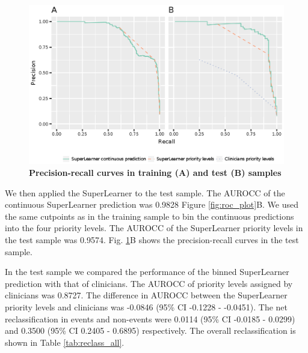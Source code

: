 \documentclass[10pt,letterpaper]{article}\usepackage[]{graphicx}\usepackage[]{color}
\begin{document}
\begin{figure}[!h]
  \caption{\bf Precision-recall curves in training (A) and test (B) samples}
  \label{fig:prec_rec_plot}
  \includegraphics{prec_rec_plot.eps}
\end{figure}

We then applied the SuperLearner to the test sample. The AUROCC of the
continuous SuperLearner prediction was 0.9828
Figure \ref{fig:roc_plot}B.  We used the same cutpoints as in the training
sample to bin the continuous predictions into the four priority levels. The
AUROCC of the SuperLearner priority levels in the test sample was
0.9574. Fig. \ref{fig:prec_rec_plot}B shows the
precision-recall curves in the test sample.

In the test sample we compared the performance of the binned SuperLearner
prediction with that of clinicians. The AUROCC of priority levels assigned by
clinicians was 0.8727. The difference in AUROCC between the
SuperLearner priority levels and clinicians was
-0.0846 (95\% CI -0.1228 - -0.0451). The net reclassification in events and
non-events were 0.0114 (95\% CI -0.0185 - 0.0299) and 0.3500 (95\% CI 0.2405 - 0.6895) respectively. The overall
reclassification is shown in Table \ref{tab:reclass_all}.
\end{document}
